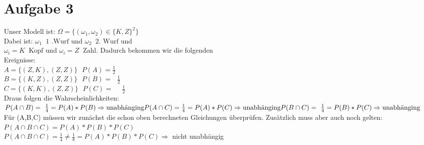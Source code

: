 \documentclass[10pt,a4paper]{article}
\newcommand{\ent}{\mathop{\widehat{=}}}
\begin{document}
\section*{Aufgabe 3}
Unser Modell ist: 
$\Omega = \{(\omega_{1},\omega_{2}) \in \{K,Z\}^2 \}$ \\
Dabei ist: $\omega_{1} \ent \text{1 .Wurf}$ und $\omega_{2} \ent \text{2. Wurf} $ und \\
$\omega_{i}=K \ent \text{Kopf} \text{ und } \omega_{i}=Z \ent \text{Zahl}$. Dadurch bekommen wir die folgenden\\ Ereignisse:\\
$A = \{(Z,K),(Z,Z)\} \text{ } P(A) = \frac{1}{2}$\\
$B = \{(K,Z),(Z,Z)\} \text{ } P(B) =\text{ } \frac{1}{2}$\\
$C = \{(K,K),(Z,Z)\} \text{ } P(C) =\text{ } \text{ } \frac{1}{2}$\\
Draus folgen die Wahrscheinlichkeiten:\\
$P(A \cap B) = \text{ }\frac{1}{4} = P(A)*P(B) \Rightarrow \text{unabhänging} \newline
P(A \cap C) = \frac{1}{4} = P(A)*P(C)  \Rightarrow \text{unabhänging} \newline
P(B \cap C) = \text{ }\frac{1}{4} = P(B)*P(C)  \Rightarrow \text{unabhänging}$\\
Für (A,B,C) müssen wir zunächst die schon oben berechneten Gleichungen überprüfen. Zusätzlich muss aber auch noch gelten: \\
$P(A \cap B \cap C) = P(A)*P(B)*P(C)$ \\
$P(A \cap B \cap C) = \frac{1}{4} \neq \frac{1}{8}  = P(A)*P(B)*P(C) \Rightarrow$  nicht unabhängig
\end{document}
